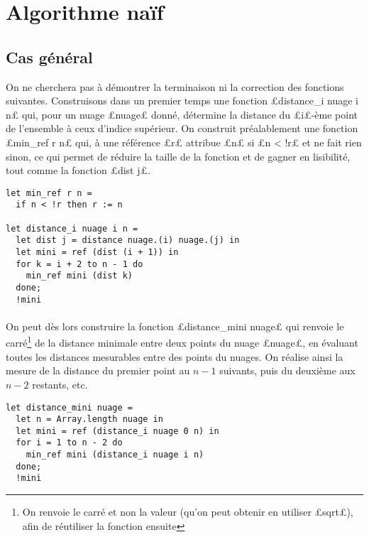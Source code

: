 \documentclass{article}
\begin{document}
  \section{Algorithme naïf}

  \subsection{Cas général}

  On ne cherchera pas à démontrer la terminaison ni la correction des fonctions suivantes. Construisons dans un premier temps une fonction £distance_i nuage i n£ qui, pour un nuage £nuage£ donné, détermine la distance du £i£-ème point de l'ensemble à ceux d'indice supérieur. On construit préalablement une fonction £min_ref r n£ qui, à une référence £r£ attribue £n£ si £n < !r£ et ne fait rien sinon, ce qui permet de réduire la taille de la fonction et de gagner en lisibilité, tout comme la fonction £dist j£.

  \begin{lstlisting}
let min_ref r n =
  if n < !r then r := n

let distance_i nuage i n =
  let dist j = distance nuage.(i) nuage.(j) in
  let mini = ref (dist (i + 1)) in
  for k = i + 2 to n - 1 do
    min_ref mini (dist k)
  done;
  !mini
  \end{lstlisting}

  \paragraph{} On peut dès lors construire la fonction £distance_mini nuage£ qui renvoie le carré\footnote{On renvoie le carré et non la valeur (qu'on peut obtenir en utiliser £sqrt£), afin de réutiliser la fonction ensuite} de la distance minimale entre deux points du nuage £nuage£, en évaluant toutes les distances mesurables entre des points du nuages. On réalise ainsi la mesure de la distance du premier point au $n - 1$ suivants, puis du deuxième aux $n - 2$ restants, etc.

  \begin{lstlisting}
let distance_mini nuage =
  let n = Array.length nuage in
  let mini = ref (distance_i nuage 0 n) in
  for i = 1 to n - 2 do
    min_ref mini (distance_i nuage i n)
  done;
  !mini
  \end{lstlisting}
\end{document}

